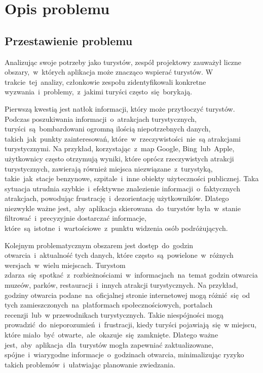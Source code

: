 
\chapter{Opis problemu}
\label{ch:opis-problemu}

\section{Przestawienie problemu}
\label{sec:przestawienie-problemu}

Analizując swoje potrzeby jako turystów, zespół projektowy zauważył liczne obszary,~w~których aplikacja może znacząco wspierać turystów.
W trakcie~tej~analizy, członkowie zespołu zidentyfikowali konkretne wyzwania~i~problemy,~z~jakimi turyści często~się~borykają.

Pierwszą kwestią jest natłok informacji, który może przytłoczyć turystów.
Podczas poszukiwania informacji~o~atrakcjach turystycznych, turyści~są~bombardowani ogromną ilością niepotrzebnych danych, takich~jak~punkty zainteresowań, które~w~rzeczywistości~nie~są atrakcjami turystycznymi.
Na przykład, korzystając~z~map Google, Bing~lub~Apple, użytkownicy często otrzymują wyniki, które oprócz rzeczywistych atrakcji turystycznych, zawierają również miejsca niezwiązane~z~turystyką, takie~jak~stacje benzynowe, szpitale~i~inne obiekty użyteczności publicznej.
Taka sytuacja utrudnia szybkie~i~efektywne znalezienie informacji~o~faktycznych atrakcjach, powodując frustrację~i~dezorientację użytkowników.
Dlatego niezwykle ważne jest,~aby~aplikacja skierowana~do~turystów była~w~stanie filtrować~i~precyzyjnie dostarczać informacje, które~są~istotne~i~wartościowe~z~punktu widzenia osób podróżujących.

Kolejnym problematycznym obszarem jest dostęp~do~godzin otwarcia~i~aktualność tych danych, które często~są~powielone~w~różnych wersjach~w~wielu miejscach.
Turystom zdarza~się~spotkać~z~rozbieżnościami~w~informacjach~na~temat godzin otwarcia muzeów, parków, restauracji~i~innych atrakcji turystycznych.
Na przykład, godziny otwarcia podane~na~oficjalnej stronie internetowej mogą różnić~się~od tych zamieszczonych~na~platformach społecznościowych, portalach recenzji~lub~w przewodnikach turystycznych.
Takie niespójności mogą prowadzić~do~nieporozumień~i~frustracji, kiedy turyści pojawiają~się~w miejscu, które miało~być~otwarte,~ale~okazuje~się~zamknięte.
Dlatego ważne jest,~aby~aplikacja~dla~turystów mogła zapewniać zaktualizowane, spójne~i~wiarygodne informacje~o~godzinach otwarcia, minimalizując ryzyko takich problemów~i~ułatwiając planowanie zwiedzania.

